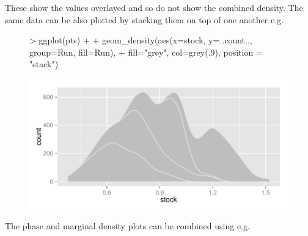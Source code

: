 \documentclass[shortnames,nojss,article]{jss}
\begin{document}
These show the values overlayed and so do not show the combined density. The same data can be also plotted by stacking them on top
of one another e.g.

\begin{figure}\begin{center}
\begin{Schunk}
\begin{Sinput}
> ggplot(pts) + 
+   geom_density(aes(x=stock, y=..count.., group=Run, fill=Run), 
+                         fill="grey", col=grey(.9), position = "stack") 
\end{Sinput}
\end{Schunk}
\includegraphics{kobe-022}
\end{center}\end{figure}

The phase and marginal density plots can be combined using  e.g.
\end{document}
